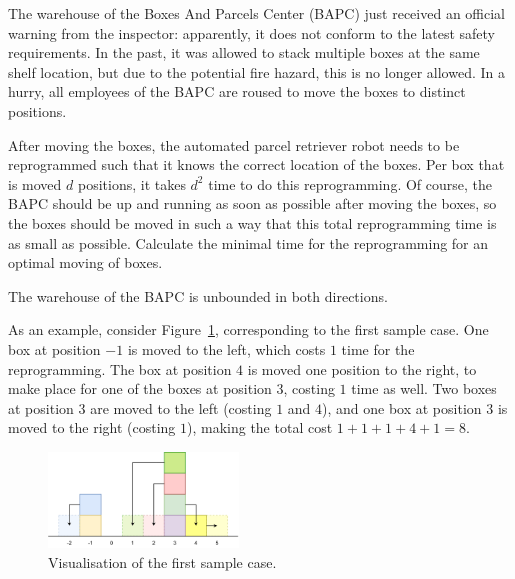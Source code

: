 

\newcommand{\maxn}{10^6}
\newcommand{\maxx}{10^9}


The warehouse of the Boxes And Parcels Center (BAPC) just received an official warning from the inspector:
apparently, it does not conform to the latest safety requirements.
In the past, it was allowed to stack multiple boxes at the same shelf location,
but due to the potential fire hazard, this is no longer allowed.
In a hurry, all employees of the BAPC are roused to move the boxes to distinct positions.

After moving the boxes, the automated parcel retriever robot needs to be reprogrammed
such that it knows the correct location of the boxes.
Per box that is moved $d$ positions, it takes $d^2$ time to do this reprogramming.
Of course, the BAPC should be up and running as soon as possible after moving the boxes,
so the boxes should be moved in such a way that this total reprogramming time is as small as possible.
Calculate the minimal time for the reprogramming for an optimal moving of boxes.

The warehouse of the BAPC is unbounded in both directions.

As an example, consider Figure~\ref{fig:heavy-1}, corresponding to the first sample case.
One box at position $-1$ is moved to the left,
which costs $1$ time for the reprogramming.
The box at position $4$ is moved one position to the right,
to make place for one of the boxes at position $3$,
costing $1$ time as well.
Two boxes at position $3$ are moved to the left (costing $1$ and $4$),
and one box at position $3$ is moved to the right (costing $1$),
making the total cost $1+1+1+4+1=8$.

\begin{figure}[h]
    \centering
    \includegraphics[width=0.45\textwidth]{merged.pdf}
    \caption{Visualisation of the first sample case.}
    \label{fig:heavy-1}
\end{figure}

